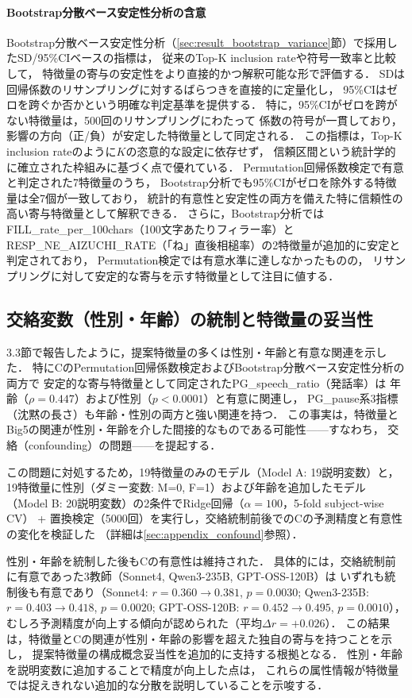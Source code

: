 \documentclass[dvipdfmx,11pt,a4paper]{bxjsarticle}
\begin{document}
\paragraph{Bootstrap分散ベース安定性分析の含意}
Bootstrap分散ベース安定性分析（\ref{sec:result_bootstrap_variance}節）で採用したSD/95\%CIベースの指標は，
従来のTop-K inclusion rateや符号一致率と比較して，
特徴量の寄与の安定性をより直接的かつ解釈可能な形で評価する．
SDは回帰係数のリサンプリングに対するばらつきを直接的に定量化し，
95\%CIはゼロを跨ぐか否かという明確な判定基準を提供する．
特に，95\%CIがゼロを跨がない特徴量は，500回のリサンプリングにわたって
係数の符号が一貫しており，影響の方向（正/負）が安定した特徴量として同定される．
この指標は，Top-K inclusion rateのように$K$の恣意的な設定に依存せず，
信頼区間という統計学的に確立された枠組みに基づく点で優れている．
Permutation回帰係数検定で有意と判定された7特徴量のうち，
Bootstrap分析でも95\%CIがゼロを除外する特徴量は全7個が一致しており，
統計的有意性と安定性の両方を備えた特に信頼性の高い寄与特徴量として解釈できる．
さらに，Bootstrap分析ではFILL\_rate\_per\_100chars（100文字あたりフィラー率）と
RESP\_NE\_AIZUCHI\_RATE（「ね」直後相槌率）の2特徴量が追加的に安定と判定されており，
Permutation検定では有意水準に達しなかったものの，
リサンプリングに対して安定的な寄与を示す特徴量として注目に値する．

\subsection{交絡変数（性別・年齢）の統制と特徴量の妥当性}

3.3節で報告したように，提案特徴量の多くは性別・年齢と有意な関連を示した．
特にCのPermutation回帰係数検定およびBootstrap分散ベース安定性分析の両方で
安定的な寄与特徴量として同定されたPG\_speech\_ratio（発話率）は
年齢（$\rho = 0.447$）および性別（$p < 0.0001$）と有意に関連し，
PG\_pause系3指標（沈黙の長さ）も年齢・性別の両方と強い関連を持つ．
この事実は，特徴量とBig5の関連が性別・年齢を介した間接的なものである可能性——すなわち，
交絡（confounding）の問題——を提起する．

この問題に対処するため，19特徴量のみのモデル（Model A: 19説明変数）と，
19特徴量に性別（ダミー変数: M=0, F=1）および年齢を追加したモデル
（Model B: 20説明変数）の2条件でRidge回帰（$\alpha = 100$，5-fold subject-wise CV）
+ 置換検定（5000回）を実行し，交絡統制前後でのCの予測精度と有意性の変化を検証した
（詳細は\ref{sec:appendix_confound}参照）．

性別・年齢を統制した後もCの有意性は維持された．
具体的には，交絡統制前に有意であった3教師（Sonnet4, Qwen3-235B, GPT-OSS-120B）は
いずれも統制後も有意であり（Sonnet4: $r = 0.360 \to 0.381$, $p = 0.0030$;
Qwen3-235B: $r = 0.403 \to 0.418$, $p = 0.0020$;
GPT-OSS-120B: $r = 0.452 \to 0.495$, $p = 0.0010$），
むしろ予測精度が向上する傾向が認められた（平均$\Delta r = +0.026$）．
この結果は，特徴量とCの関連が性別・年齢の影響を超えた独自の寄与を持つことを示し，
提案特徴量の構成概念妥当性を追加的に支持する根拠となる．
性別・年齢を説明変数に追加することで精度が向上した点は，
これらの属性情報が特徴量では捉えきれない追加的な分散を説明していることを示唆する．
\end{document}
